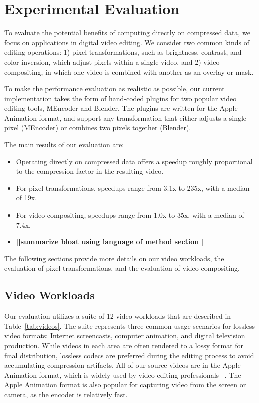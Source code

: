 \section{Experimental Evaluation}

To evaluate the potential benefits of computing directly on compressed
data, we focus on applications in digital video editing.  We consider
two common kinds of editing operations: 1) pixel transformations, such
as brightness, contrast, and color inversion, which adjust pixels
within a single video, and 2) video compositing, in which one video is
combined with another as an overlay or mask.

To make the performance evaluation as realistic as possible, our
current implementation takes the form of hand-coded plugins for two
popular video editing tools, MEncoder and Blender.  The plugins are
written for the Apple Animation format, and support any transformation
that either adjusts a single pixel (MEncoder) or combines two pixels
together (Blender).

The main results of our evaluation are:
\begin{itemize}

\item Operating directly on compressed data offers a speedup roughly
proportional to the compression factor in the resulting video.

\item For pixel transformations, speedups range from 3.1x to 235x,
with a median of 19x.

\item For video compositing, speedups range from 1.0x to 35x, with a
median of 7.4x.

\item {\bf [[summarize bloat using language of method section]]}

\end{itemize}
The following sections provide more details on our video workloads,
the evaluation of pixel transformations, and the evaluation of video
compositing.

\subsection{Video Workloads}

Our evaluation utilizes a suite of 12 video workloads that are
described in Table~\ref{tab:videos}.  The suite represents three
common usage scenarios for lossless video formats: Internet
screencasts, computer animation, and digital television production.
While videos in each area are often rendered to a lossy format for
final distribution, lossless codecs are preferred during the editing
process to avoid accumulating compression artifacts.  All of our
source videos are in the Apple Animation format, which is widely used
by video editing professionals~\cite[p.~106]{adobe-anim}
\cite[p.~284]{harrington-anim} \cite[p.~367]{long-anim}
\cite[p.~280]{pogue-anim}.  The Apple Animation format is also popular
for capturing video from the screen or camera, as the encoder is
relatively fast.

